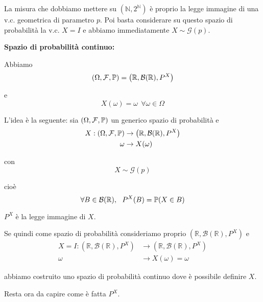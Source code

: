 \begin{enumerate}
\begin{oss}
La misura che dobbiamo mettere su $\left(\mathbb{N} ,2^{\mathbb{N}}\right)$ è proprio la legge immagine di una v.c. geometrica di parametro $p$. Poi basta considerare su questo spazio di probabilità la v.c. $X=I$ e abbiamo immediatamente $X\sim \mathcal{G}( p)$.
\end{oss}

\textbf{Spazio di probabilità continuo:}

Abbiamo
\begin{equation*}
( \Omega ,\mathcal{F} ,\mathbb{P}) =\left(\mathbb{R} ,\mathcal{B}(\mathbb{R}) ,P^{X}\right)
\end{equation*}

e
\begin{equation*}
X( \omega ) =\omega \ \ \forall \omega \in \Omega 
\end{equation*}

L'idea è la seguente: sia $( \Omega ,\mathcal{F} ,\mathbb{P})$ un generico spazio di probabilità e
\begin{align*}
X:( \Omega ,\mathcal{F} ,\mathbb{P}) & \rightarrow \left(\mathbb{R} ,\mathcal{B}(\mathbb{R}) ,P^{X}\right)\\
\omega  & \rightarrow X( \omega )
\end{align*}

con
\begin{equation*}
X\sim \mathcal{G}( p)
\end{equation*}

cioè\begin{equation*}
\forall B\in \mathcal{B}(\mathbb{R}) ,\ \ P^{X}( B) =\mathbb{P}( X\in B)
\end{equation*}

$P^{X}$ è la legge immagine di $X$.

Se quindi come spazio di probabilità consideriamo proprio $\left(\mathbb{R} ,\mathcal{B}(\mathbb{R}) ,P^{X}\right)$ e
\begin{align*}
X=I:\left(\mathbb{R} ,\mathcal{B}(\mathbb{R}) ,P^{X}\right) & \rightarrow \left(\mathbb{R} ,\mathcal{B}(\mathbb{R}) ,P^{X}\right)\\
\omega  & \rightarrow X( \omega ) =\omega 
\end{align*}

abbiamo costruito uno spazio di probabilità continuo dove è possibile definire $X$.

Resta ora da capire come è fatta $P^{X}$.



\end{enumerate}

